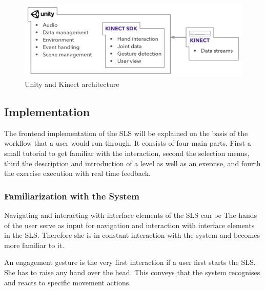 \begin{figure}[htb]
	\centering
	\begin{minipage}[t]{1\linewidth}
		\centering
		\includegraphics[width=1\linewidth]{Pictures/5_3_unityKinectArchitecture}
		\caption{Unity and Kinect architecture}%
		\label{fig:5_3_unityKinectArchitecture}
	\end{minipage}
\end{figure}

\subsection{Implementation}
The frontend implementation of the SLS will be explained on the basis of the workflow that a user would run through. It consists of four main parts. First a small tutorial to get familiar with the interaction,  second the selection menus, third the description and introduction of a level as well as an exercise, and fourth the exercise execution with real time feedback. 

\subsubsection{Familiarization with the System}
Navigating and interacting with interface elements of the SLS can be 
The hands of the user serve as input for navigation and interaction with interface elements in the SLS. Therefore she is in constant interaction with the system and becomes more familiar to it.

An engagement gesture is the very first interaction if a user first starts the SLS. She has to raise any hand over the head. This conveys that the system recognises and reacts to specific movement actions. 


